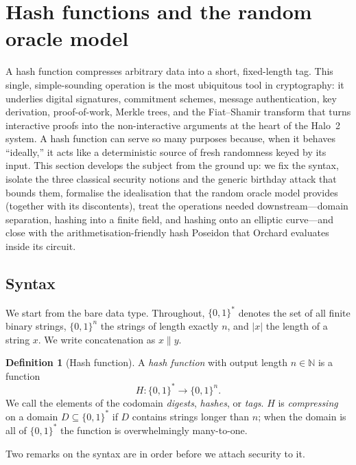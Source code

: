 \documentclass[11pt,a4paper]{article}
\theoremstyle{definition}
\newtheorem{definition}[theorem]{Definition}
\theoremstyle{remark}
\newcommand{\N}{\ensuremath{\mathbb{N}}}
\begin{document}
\clearpage

\section{Hash functions and the random oracle model}\label{sec:hash}

A hash function compresses arbitrary data into a short, fixed-length tag. This single, simple-sounding operation is the most ubiquitous tool in cryptography: it underlies digital signatures, commitment schemes, message authentication, key derivation, proof-of-work, Merkle trees, and the Fiat--Shamir transform that turns interactive proofs into the non-interactive arguments at the heart of the Halo~2 system. A hash function can serve so many purposes because, when it behaves ``ideally,'' it acts like a deterministic source of fresh randomness keyed by its input. This section develops the subject from the ground up: we fix the syntax, isolate the three classical security notions and the generic birthday attack that bounds them, formalise the idealisation that the random oracle model provides (together with its discontents), treat the operations needed downstream---domain separation, hashing into a finite field, and hashing onto an elliptic curve---and close with the arithmetisation-friendly hash Poseidon that Orchard evaluates inside its circuit.

\subsection{Syntax}\label{hash:sub:syntax}

We start from the bare data type. Throughout, \(\{0,1\}^{*}\) denotes the set of all finite binary strings, \(\{0,1\}^{n}\) the strings of length exactly \(n\), and \(|x|\) the length of a string \(x\). We write concatenation as \(x \mathbin{\|} y\).

\begin{definition}[Hash function]\label{hash:def:hashfn}
A \emph{hash function} with output length \(n \in \N\) is a function
\[
  H \colon \{0,1\}^{*} \longrightarrow \{0,1\}^{n}.
\]
We call the elements of the codomain \emph{digests}, \emph{hashes}, or \emph{tags}. \(H\) is \emph{compressing} on a domain \(D \subseteq \{0,1\}^{*}\) if \(D\) contains strings longer than \(n\); when the domain is all of \(\{0,1\}^{*}\) the function is overwhelmingly many-to-one.
\end{definition}

Two remarks on the syntax are in order before we attach security to it.
\end{document}
